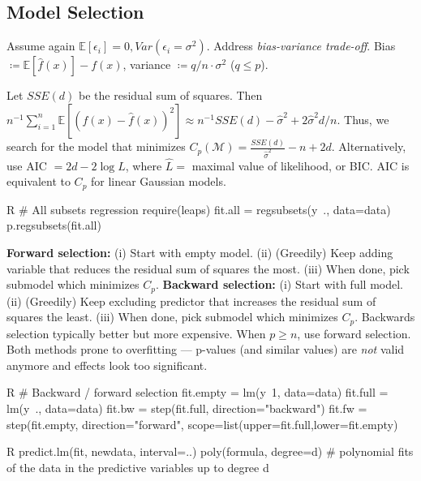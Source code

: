 \subsection{Model Selection}\label{subsec:model_selection}
\begin{sectionbox}\nospacing{}
  Assume again $\mathbb{E}[\epsilon_{i}] = 0, Var(\epsilon_{i} = \sigma^{2})$.
  Address \emph{bias-variance trade-off}.
  Bias $\coloneq\mathbb{E} [\hat f(x)] - f(x)$, variance $\coloneq q/n \cdot \sigma^{2}$ ($q \leq p$).
\end{sectionbox}
\begin{sectionbox}\nospacing{}
  Let $SSE(d)$ be the residual sum of squares.
  Then $n^{-1} \sum_{i=1}^{n} \mathbb{E}\left[{(f(x) - \hat f(x))}^{2}\right] \approx n^{-1}SSE(d)-\hat \sigma^{2} + 2\hat\sigma^{2}d/n$.
  Thus, we search for the model that minimizes $C_{p}(\mathcal{M}) = \frac{SSE(d)}{\hat \sigma^{2}} - n + 2d$.
  Alternatively, use AIC $=2d-2\log \hat{L}$, where $\hat{L}=$ maximal value of likelihood, or BIC. AIC is equivalent to $C_{p}$ for linear Gaussian models.
  \begin{mintlinebox}{R}
    # All subsets regression
    require(leaps)
    fit.all = regsubsets(y~., data=data)
    p.regsubsets(fit.all)
  \end{mintlinebox}
\end{sectionbox}
\begin{sectionbox}\nospacing{}
  \textbf{Forward selection:} (i) Start with empty model. (ii) (Greedily) Keep adding variable that reduces the residual sum of squares the most. (iii) When done, pick submodel which minimizes $C_{p}$.
  \textbf{Backward selection:} (i) Start with full model. (ii) (Greedily) Keep excluding predictor that increases the residual sum of squares the least. (iii) When done, pick submodel which minimizes $C_{p}$. Backwards selection typically better but more expensive. When $p \geq n$, use forward selection.
  Both methods prone to overfitting --- p-values (and similar values) are \emph{not} valid anymore and effects look too significant.
  \begin{mintlinebox}{R}
    # Backward / forward selection
    fit.empty = lm(y~1, data=data)
    fit.full = lm(y~., data=data)
    fit.bw = step(fit.full, direction="backward")
    fit.fw = step(fit.empty, direction="forward", scope=list(upper=fit.full,lower=fit.empty)
  \end{mintlinebox}

\end{sectionbox}
\begin{mintlinebox}{R}
 predict.lm(fit, newdata, interval=..)
 poly(formula, degree=d) # polynomial fits of the data in the predictive variables
up to degree d
\end{mintlinebox}
